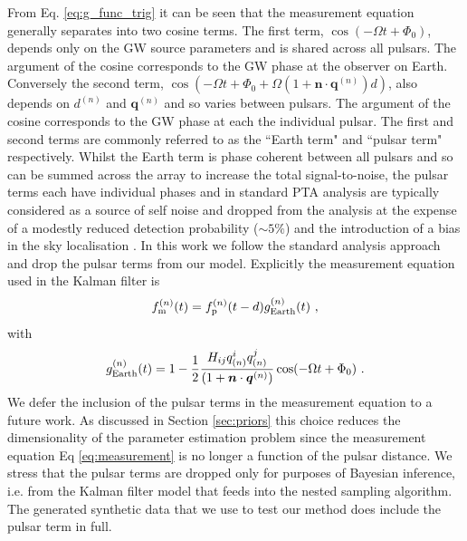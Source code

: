 \documentclass[fleqn,usenatbib,useAMS]{mnras}
\begin{document}
From Eq. \ref{eq:g_func_trig} it can be seen that the measurement equation generally separates into two cosine terms. The first term, $\cos(-\Omega t + \Phi_0)$, depends only on the GW source parameters and is shared across all pulsars. The argument of the cosine corresponds to the GW phase at the observer on Earth.  Conversely the second term, $\cos \left(-\Omega t +\Phi_0 + \Omega \left(1 + \boldsymbol{n}\cdot \boldsymbol{q}^{(n)} \right)  d \right)$, also depends on $d^{(n)}$ and $\boldsymbol{q}^{(n)}$ and so varies between pulsars. The argument of the cosine corresponds to the GW phase at each the individual pulsar. The first and second terms are commonly referred to as the ``Earth term" and ``pulsar term" respectively. Whilst the Earth term is phase coherent between all pulsars and so can be summed across the array to increase the total signal-to-noise, the pulsar terms each have individual phases and in standard PTA analysis are typically considered as a source of self noise and dropped from the analysis \citep[e.g.][]{Sesana2010,Babak2012,Petiteau2013,Zhu2015,Taylors2016,Goldstein2018,Charisi2023arXiv230403786C} at the expense of a modestly reduced detection probability ($\sim 5 \%$) and the introduction of a bias in the sky localisation \citep{Zhupulsarterms,Chen2022}. In this work we follow the standard analysis approach and drop the pulsar terms from our model. Explicitly the measurement equation used in the Kalman filter is
\begin{equation}
		f_{\rm m}^{(n)}(t) = f_{\rm p}^{(n)}(t-d) g^{(n)}_{\rm Earth}(t) \ , 
		\label{eq:measuremen_earth}
	\end{equation}
	with
	\begin{equation}
		g^{(n)}_{\rm Earth}(t) = 1 - \frac{1}{2} \frac{ H_{ij}q^i_{(n)} q^j_{(n)} }{(1 + \boldsymbol{n}\cdot \boldsymbol{q}^{(n)}) }  \cos(-\Omega t +\Phi_0)  \ .
		\label{eq:g_func_trig_earth}
	\end{equation}
	We defer the inclusion of the pulsar terms in the measurement equation to a future work. As discussed in Section \ref{sec:priors} this choice reduces the dimensionality of the parameter estimation problem since the measurement equation Eq \ref{eq:measurement} is no longer a function of the pulsar distance.  We stress that the pulsar terms are dropped only for purposes of Bayesian inference, i.e. from the Kalman filter model that feeds into the nested sampling algorithm. The generated synthetic data that we use to test our method does include the pulsar term in full. \newline
\end{document}
